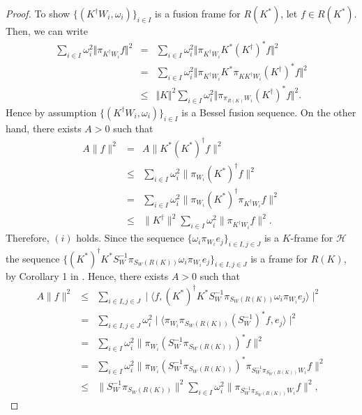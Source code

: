 \documentclass{birkjour}
\theoremstyle{definition}
\theoremstyle{remark}
\numberwithin{equation}{section}
\begin{document}
\begin{proof}
To show $\lbrace (K^{\dag}W_{i},
    \omega_{i})\rbrace_{i\in I}$ is a fusion frame for $R(K^{*})$,  let $f\in R(K^{*})$. Then, we can write
\begin{eqnarray*}  \sum_{i\in I}\omega_{i}^{2}\Vert \pi_{K^{\dag}W_{i}}f \Vert^{2}&=&  \sum_{i\in I}\omega_{i}^{2}\Vert \pi_{K^{\dag}W_{i}}K^{*}(K^{\dag})^{*}f\Vert^{2} \\
&=&\sum_{i\in I}\omega_{i}^{2}\Vert \pi_{K^{\dag}W_{i}}K^{*}\pi_{KK^{\dag}W_{i}}(K^{\dag})^{*}f\Vert^{2} \\
&\leq& \Vert K\Vert^{2}\sum_{i\in I}\omega_{i}^{2}\Vert \pi_{\pi_{R(K)}W_{i}}(K^{\dag})^{*}f \Vert^{2}.
 \end{eqnarray*}
Hence by assumption $\lbrace (K^{\dag}W_{i},
    \omega_{i})\rbrace_{i\in I}$ is a  Bessel fusion  sequence.
On the other hand, there exists
 $A>0$ such that
\begin{eqnarray*} A \|f\|^{2} &=& A\|K^{*}(K^{*})^{\dag}f\|^{2}\\
&\leq& \sum_{i\in I}\omega_{i}^{2}\|\pi_{W_{i}}(K^{*})^{\dag}f\|^{2}\\
&=& \sum_{i\in I}\omega_{i}^{2}\|\pi_{W_{i}}(K^{*})^{\dag}\pi_{K^{\dag}W_{i}}f\|^{2}\\
&\leq&
\|K^{\dag}\|^{2}\sum_{i\in I}\omega_{i}^{2}\|\pi_{K^{\dag}W_{i}}f\|^{2}.
 \end{eqnarray*}
 Therefore, $(i)$  holds. Since the sequence $\{\omega_{i}\pi_{W_{i}}e_{j}\}_{i\in I, j\in J}$ is a $K$-frame for $\mathcal{H}$ the sequence
 $\{(K^{*})^{\dag}K^{*}S_{W}^{-1}\pi_{S_{W}(R(K))}\omega_{i}\pi_{W_{i}}e_{j}\}_{i\in I, j\in J}$
  is a frame for $R(K)$,   by  Corollary 1 in \cite{arefi3}. Hence, there exists $A>0$ such that
\begin{eqnarray*} A \|f\|^{2} &\leq& \sum_{i\in I, j\in J}\mid \langle
f,(K^{*})^{\dag}K^{*}S_{W}^{-1}\pi_{S_{W}(R(K))}\omega_{i}\pi_{W_{i}}e_{j} \rangle\mid^{2}\\
&=& \sum_{i\in I, j\in J}\omega_{i}^{2}\mid \langle
\pi_{W_{i}}\pi_{S_{W}(R(K))}(S_{W}^{-1})^{*}f,e_{j} \rangle\mid^{2}\\
&=& \sum_{i\in I}\omega_{i}^{2}\|\pi_{W_{i}}(S_{W}^{-1}\pi_{S_{W}(R(K))})^{*}f\|^{2}\\
&=&
\sum_{i\in I}\omega_{i}^{2}\|\pi_{W_{i}}(S_{W}^{-1}\pi_{S_{W}(R(K))})^{*}\pi_{S_{W}^{-1}\pi_{S_{W}(R(K))}W_{i}}f\|^{2}\\
&\leq&
\|S_{W}^{-1}\pi_{S_{W}(R(K))}\|^{2}\sum_{i\in I}\omega_{i}^{2}\|\pi_{S_{W}^{-1}\pi_{S_{W}(R(K))}W_{i}}f\|^{2},
 \end{eqnarray*}

\end{proof}
\end{document}
